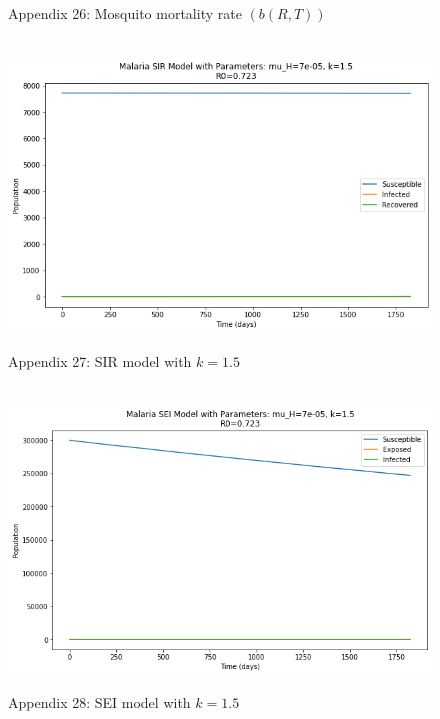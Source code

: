 \documentclass[
	12pt,				%
	oneside,			%
	a4paper,			%
	english,			%
	brazil				%
	]{abntex2}
\begin{document}
\begin{apendicesenv}
\begin{figure}[!ht]
	\caption*{Appendix 26: Mosquito mortality rate $(b(R,T))$}
\end{figure}
\newpage
\begin{figure}[!ht]
	\centering
	\hbox{\hspace{3.0em} \includegraphics[scale=0.6] {THESIS-SIR_k_1_5.png}}
	\caption*{Appendix 27: SIR model with $k=1.5$}
\end{figure} 
\begin{figure}[!ht]
	\centering
	\hbox{\hspace{3.0em} \includegraphics[scale=0.6] {THESIS-SEI_k_1_5.png}}
	\caption*{Appendix 28: SEI model with $k=1.5$}
\end{figure}
\newpage
\begin{figure}[!ht]
	\centering

\end{figure}
\end{apendicesenv}
\end{document}
